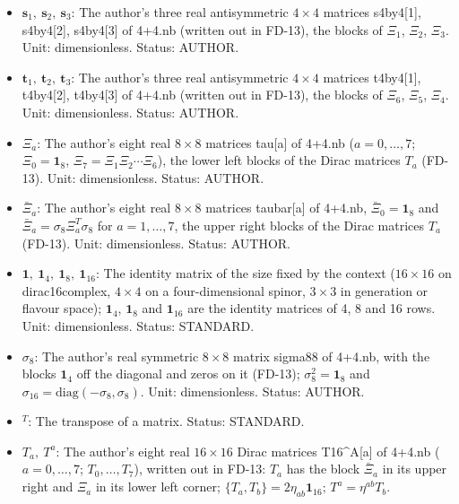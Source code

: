 \documentclass[
  10pt,
]{article}
\providecommand{\tightlist}{%
  \setlength{\itemsep}{0pt}\setlength{\parskip}{0pt}}
\begin{document}
\begin{itemize}
\tightlist
\item
  \(\mathbf{s}_1,\ \mathbf{s}_2,\ \mathbf{s}_3\): The author's three
  real antisymmetric \(4 \times 4\) matrices s4by4{[}1{]}, s4by4{[}2{]},
  s4by4{[}3{]} of 4+4.nb (written out in FD-13), the blocks of
  \(\Xi_1\), \(\Xi_2\), \(\Xi_3\). Unit: dimensionless. Status: AUTHOR.
\item
  \(\mathbf{t}_1,\ \mathbf{t}_2,\ \mathbf{t}_3\): The author's three
  real antisymmetric \(4 \times 4\) matrices t4by4{[}1{]}, t4by4{[}2{]},
  t4by4{[}3{]} of 4+4.nb (written out in FD-13), the blocks of
  \(\Xi_6\), \(\Xi_5\), \(\Xi_4\). Unit: dimensionless. Status: AUTHOR.
\item
  \(\Xi_a\): The author's eight real \(8 \times 8\) matrices tau{[}a{]}
  of 4+4.nb (\(a = 0, \dots, 7\); \(\Xi_0 = \mathbf{1}_8\),
  \(\Xi_7 = \Xi_1\Xi_2\cdots\Xi_6\)), the lower left blocks of the Dirac
  matrices \(T_a\) (FD-13). Unit: dimensionless. Status: AUTHOR.
\item
  \(\bar\Xi_a\): The author's eight real \(8 \times 8\) matrices
  taubar{[}a{]} of 4+4.nb, \(\bar\Xi_0 = \mathbf{1}_8\) and
  \(\bar\Xi_a = \sigma_8\Xi_a^T\sigma_8\) for \(a = 1, \dots, 7\), the
  upper right blocks of the Dirac matrices \(T_a\) (FD-13). Unit:
  dimensionless. Status: AUTHOR.
\item
  \(\mathbf{1},\ \mathbf{1}_4,\ \mathbf{1}_8,\ \mathbf{1}_{16}\): The
  identity matrix of the size fixed by the context (\(16 \times 16\) on
  dirac16complex, \(4 \times 4\) on a four-dimensional spinor,
  \(3 \times 3\) in generation or flavour space); \(\mathbf{1}_4\),
  \(\mathbf{1}_8\) and \(\mathbf{1}_{16}\) are the identity matrices of
  4, 8 and 16 rows. Unit: dimensionless. Status: STANDARD.
\item
  \(\sigma_8\): The author's real symmetric \(8 \times 8\) matrix
  sigma88 of 4+4.nb, with the blocks \(\mathbf{1}_4\) off the diagonal
  and zeros on it (FD-13); \(\sigma_8^2 = \mathbf{1}_8\) and
  \(\sigma_{16} = \mathrm{diag}(-\sigma_8, \sigma_8)\). Unit:
  dimensionless. Status: AUTHOR.
\item
  \({}^T\): The transpose of a matrix. Status: STANDARD.
\item
  \(T_a,\ T^a\): The author's eight real \(16 \times 16\) Dirac matrices
  T16\^{}A{[}a{]} of 4+4.nb (\(a = 0, \dots, 7\); \(T_0, \dots, T_7\)),
  written out in FD-13: \(T_a\) has the block \(\bar\Xi_a\) in its upper
  right and \(\Xi_a\) in its lower left corner;
  \(\{T_a, T_b\} = 2\eta_{ab}\mathbf{1}_{16}\); \(T^a = \eta^{ab}T_b\).

\end{itemize}
\end{document}
